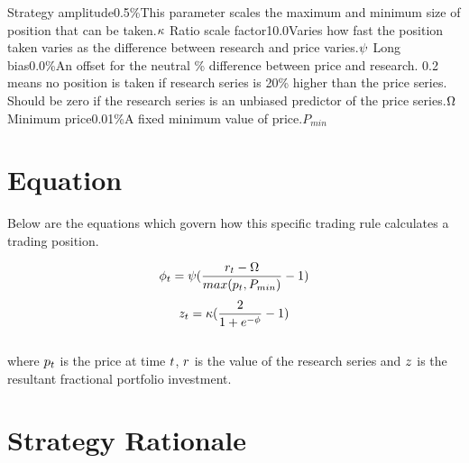 \documentclass{article}
\begin{document}
{Strategy amplitude}{0.5\%}{This parameter scales the maximum and minimum size of position that can be taken.}{$\kappa$}
{Ratio scale factor}{10.0}{Varies how fast the position taken varies as the difference between research and price varies.}{$\psi$}
{Long bias}{0.0\%}{An offset for the neutral \% difference between price and research. 0.2 means no position is taken if research series is 20\% higher than the price series. Should be zero if the research series is an unbiased predictor of the price series.}{$\Omega$}
{Minimum price}{0.01\%}{A fixed minimum value of price.}{$P_{min}$}
\stoptable

\section{Equation}
Below are the equations which govern how this specific trading rule calculates a trading position.

\begin{equation}
\phi_t = \psi (\frac{r_t - \Omega}{max(p_t, P_{min})} - 1)
\end{equation}
\begin{equation}
z_t = \kappa ( \frac{2}{1 + e^{-\phi}} - 1 )
\end{equation}
\\ %
where $p_t$ is the price at time $t$, $r$ is the value of the research series and $z$ is the resultant fractional portfolio investment.

\hspace{200mm}
\hspace{200mm}


\section{Strategy Rationale}
\end{document}
